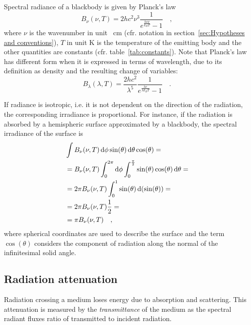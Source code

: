 \documentclass[a4paper,10pt,twocolumn,\classoptions]{article}
\begin{document}
Spectral radiance of a blackbody is given by Planck's law
\begin{equation}
  \label{eq:spectral_radiance_blackbody}
  B_\nu (\nu, T) = 2 h c^2 \nu^3 \frac{1}{e^\frac{h c \nu}{k_B T} - 1}
  \quad ,
\end{equation}
where $\nu$ is the wavenumber in unit \unit{\per\centi\metre} (cfr. notation in section~\ref{sec:Hypotheses and conventions}), $T$ in unit \unit{\kelvin} is the temperature of the emitting body and the other quantities are constants (cfr. table~\ref{tab:constants}).
Note that Planck's law has different form when it is expressed in terms of wavelength, due to its definition as density and the resulting change of variables:
\begin{equation}
  \label{eq:spectral_radiance_blackbody_lambda}
  B_\lambda (\lambda, T) = \frac{2 h c^2}{\lambda^5} \frac{1}{e^\frac{h c}{\lambda k_B T} - 1}
  \quad .
\end{equation}

If radiance is isotropic, i.e. it is not dependent on the direction of the radiation, the corresponding irradiance is proportional. For instance, if the radiation is absorbed by a hemispheric surface approximated by a blackbody, the spectral irradiance of the surface is
\begin{equation}
  \label{eq:spectral_irradiance_blackbody_hemisphere}
  \begin{split}
    & \int B_\nu (\nu, T) \odif{\phi} \sin(\theta) \odif{\theta} \cos(\theta) = \\
    & = B_\nu (\nu, T) \int_0^{2\pi} \odif{\phi} \int_0^\frac{\pi}{2} \sin(\theta) \cos(\theta) \odif{\theta} = \\
    & = 2 \pi B_\nu (\nu, T) \int_0^1 \sin(\theta) \odif{(\sin(\theta))} = \\
    & = 2 \pi B_\nu (\nu, T) \frac{1}{2} = \\
    & = \pi B_\nu (\nu, T)
    \quad ,
  \end{split}
\end{equation}
where spherical coordinates are used to describe the surface and the term $\cos(\theta)$ considers the component of radiation along the normal of the infinitesimal solid angle.



\subsection{Radiation attenuation}
\label{sec:Radiation attenuation}
Radiation crossing a medium loses energy due to absorption and scattering. This attenuation is measured by the \emph{transmittance} of the medium as the spectral radiant fluxes ratio of transmitted to incident radiation.
\end{document}
